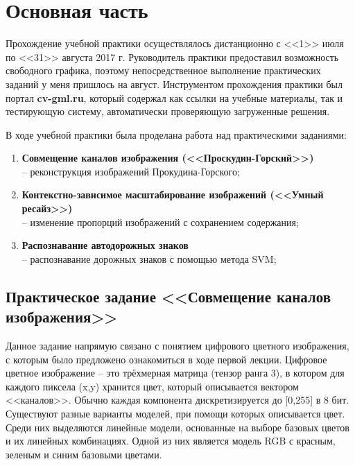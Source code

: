 \documentclass[a4paper, 12pt]{article}
\begin{document}
\newpage
\section*{Основная часть}
%

Прохождение учебной практики осуществлялось дистанционно с <<1>> июля по <<31>> августа 2017 г. Руководитель практики предоставил возможность свободного графика, поэтому непосредственное выполнение практических заданий у меня пришлось на август. Инструментом прохождения практики был портал \textbf{cv-gml.ru}, который содержал как ссылки на учебные материалы, так и тестирующую систему, автоматически проверяющую загруженные решения.

В ходе учебной практики была проделана работа над практическими заданиями:
\begin{enumerate}
\item \textbf{Совмещение каналов изображения (<<Проскудин-Горский>>)} \\-- реконструкция изображений Прокудина-Горского;
\item \textbf{Контекстно-зависимое масштабирование изображений (<<Умный ресайз>>)} \\-- изменение пропорций изображений с сохранением содержания;
\item \textbf{Распознавание автодорожных знаков} \\-- распознавание дорожных знаков с помощью метода SVM;
\end{enumerate}

\subsection*{Практическое задание <<Совмещение каналов изображения>>}
%

Данное задание напрямую связано с понятием цифрового цветного изображения, с которым было предложено ознакомиться в ходе первой лекции. Цифровое цветное изображение -- это
трёхмерная матрица (тензор ранга 3), в котором для каждого пиксела (x,y) хранится цвет, который описывается вектором <<каналов>>. Обычно каждая компонента дискретизируется до [0,255] в 8 бит. Существуют разные варианты моделей, при помощи которых описывается цвет. Среди них выделяются линейные модели, основанные на выборе базовых цветов и их
линейных комбинациях. Одной из них является модель RGB с красным, зеленым и синим базовыми цветами.
\end{document}
